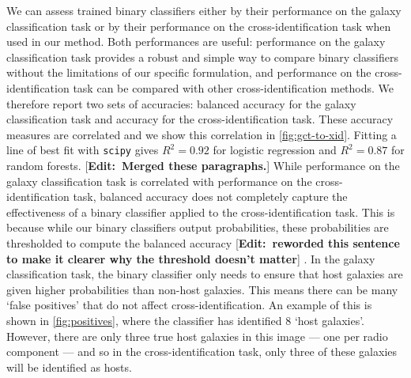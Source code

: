 \documentclass[fleqn,usenatbib,usedcolumn]{mnras}
\newcommand{\edit}[1]{ {\color{red}[{\bf Edit:~{#1}}]} }
\begin{document}
    We can assess trained binary classifiers either by their performance on the galaxy classification task or by their performance on the cross-identification task when used in our method. Both performances are useful: performance on the galaxy classification task provides a robust and simple way to compare binary classifiers without the limitations of our specific formulation, and performance on the cross-identification task can be compared with other cross-identification methods. We therefore report two sets of accuracies: balanced accuracy for the galaxy classification task and accuracy for the cross-identification task. These accuracy measures are correlated and we show this correlation in \autoref{fig:gct-to-xid}. Fitting a line of best fit with \texttt{scipy} gives $R^2 = 0.92$ for logistic regression and $R^2 = 0.87$ for random forests. \edit{Merged these paragraphs.} While performance on the galaxy classification task is correlated with performance on the cross-identification task, balanced accuracy does not completely capture the effectiveness of a binary classifier applied to the cross-identification task. This is because while our binary classifiers output probabilities, these probabilities are thresholded to compute the balanced accuracy \edit{reworded this sentence to make it clearer why the threshold doesn't matter}. In the galaxy classification task, the binary classifier only needs to ensure that host galaxies are given higher probabilities than non-host galaxies. This means there can be many `false positives' that do not affect cross-identification. An example of this is shown in \autoref{fig:positives}, where the classifier has identified 8 `host galaxies'. However, there are only three true host galaxies in this image --- one per radio component --- and so in the cross-identification task, only three of these galaxies will be identified as hosts.
\end{document}
